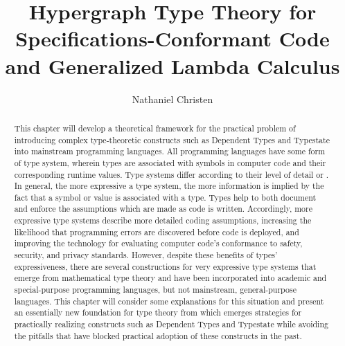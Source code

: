 \documentclass[svgnames,twocolumn]{article}
\begin{document}
\title{Hypergraph Type Theory for
Specifications-Conformant Code and
Generalized Lambda Calculus}
\author{Nathaniel Christen}
\maketitle{}
\begin{abstract}This chapter will develop a theoretical framework
for the practical problem of introducing complex type-theoretic
constructs such as Dependent Types and Typestate into
mainstream programming languages.  All programming
languages have some form of type system, wherein types
are associated with symbols in computer code and
their corresponding runtime values.  Type
systems differ according to their level of detail or .
In general, the more expressive a type system,
the more information is implied by the fact that a symbol or value is
associated with a type.  Types help to both document and enforce
the assumptions which are made as code is written.  Accordingly,
more expressive type systems describe more detailed coding
assumptions, increasing the likelihood that programming errors are
discovered before code is deployed, and improving the technology
for evaluating computer code's conformance to
safety, security, and privacy standards.  However,
despite these benefits
of types' expressiveness, there are several constructions for
very expressive type systems that emerge from mathematical
type theory and have been incorporated into academic and
special-purpose programming languages, but not
mainstream, general-purpose languages.  This chapter will consider
some explanations for this situation and present an
essentially new foundation for type theory from which
emerges strategies for practically realizing 
constructs \mdash{} such as Dependent Types and Typestate \mdash{} while
avoiding the pitfalls that have blocked practical adoption
of these constructs in the past.
\end{abstract}
\end{document}
